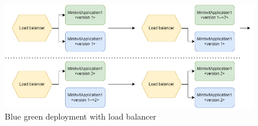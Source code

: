 \begin{figure}[!ht]
    \centering
    \captionsetup{justification=centering,margin=1cm}
    \includegraphics[width=150mm]{images/diagrams/load_balancer.drawio.png}
    \caption{Blue green deployment with load balancer}
    \label{fig:LoadBalancer}
\end{figure}

